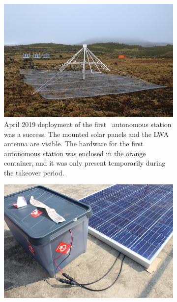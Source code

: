 \begin{figure}
	\centering
	\begin{subfigure}[t]{\textwidth}
		\centering
		\includegraphics[width=\linewidth]{Figures/station}
		\caption{April 2019 deployment of the first \albatros\ autonomous station was a success. The mounted solar panels and the LWA antenna are visible. The hardware for the first autonomous station was enclosed in the orange container, and it was only present temporarily during the takeover period.}
		\label{Fig:station}
	\end{subfigure}
	\hfill
	\begin{subfigure}[t]{0.52\textwidth}
		\centering
		\includegraphics[width=\linewidth]{Figures/rooftop1} 
		\caption{} \label{Fig:rooftop1}
	\end{subfigure}
	\hfill
	\begin{subfigure}[t]{0.47\textwidth}
		\centering

\end{subfigure}
\end{figure}
